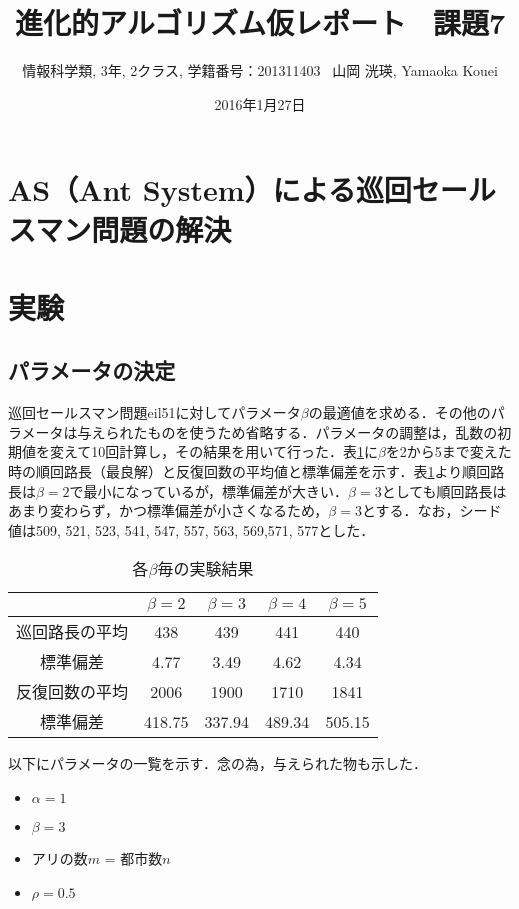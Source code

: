 \documentclass[a4j]{jarticle}
\title{進化的アルゴリズム仮レポート \ 課題7}
\author{情報科学類, 3年, 2クラス, 学籍番号：201311403 \ 山岡 洸瑛, Yamaoka
Kouei}
\date{2016年1月27日}
\begin{document}
\maketitle

\section*{AS（Ant System）による巡回セールスマン問題の解決}
\section*{実験}
\subsection*{パラメータの決定}
巡回セールスマン問題eil51に対してパラメータ$\beta$の最適値を求める．その他のパラメータは与えられたものを使うため省略する．パラメータの調整は，乱数の初期値を変えて10回計算し，その結果を用いて行った．表\ref{beta}に$\beta$を2から5まで変えた時の順回路長（最良解）と反復回数の平均値と標準偏差を示す．表\ref{beta}より順回路長は$\beta=2$で最小になっているが，標準偏差が大きい．$\beta=3$としても順回路長はあまり変わらず，かつ標準偏差が小さくなるため，$\beta=3$とする．なお，シード値は{509, 521, 523, 541, 547, 557, 563, 569,571, 577}とした．
\begin{table}[H]
 \begin{center}
  \label{beta}
  \caption{各$\beta$毎の実験結果}
  \begin{tabular}[tb]{|c|c|c|c|c|}\hline
    &$ \beta = 2 $&$ \beta = 3 $&$ \beta = 4 $&$ \beta = 5 $\\\hline
巡回路長の平均 & 438 & 439 & 441 & 440 \\\hline
標準偏差 & 4.77 & 3.49 & 4.62 & 4.34 \\\hline
反復回数の平均 & 2006 & 1900 & 1710 & 1841 \\\hline
標準偏差 & 418.75 & 337.94 & 489.34 & 505.15 \\\hline
  \end{tabular}
 \end{center}
\end{table}

\par 以下にパラメータの一覧を示す．念の為，与えられた物も示した．
\begin{itemize}
 \item $\alpha = 1$
 \item $\beta = 3$
 \item アリの数$m$ = 都市数$n$
 \item $\rho = 0.5$
\end{itemize}
\end{document}
